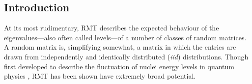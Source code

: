 \documentclass[12pt]{spieman}  %
\begin{document}
\begin{spacing}{2}   %

\section{Introduction}
\label{sect:intro}  %


At its most rudimentary, RMT describes the expected behaviour of the
eigenvalues—also often called levels—of a number of classes of random
matrices\cite{andersonIntroductionRandomMatrices2010,
akemannOxfordHandbookRandom2011, mehtaRandomMatrices2004}. A random matrix is,
simplifying somewhat, a matrix in which the entries are drawn from
independently and identically distributed (\textit{iid}) distributions. Though
first developed to describe the fluctuation of nuclei energy levels in quantum
physics \cite{mehtaRandomMatrices2004, guhrRandommatrixTheoriesQuantum1998a},
RMT has been shown have extremely broad potential.


\end{spacing}
\end{document}
